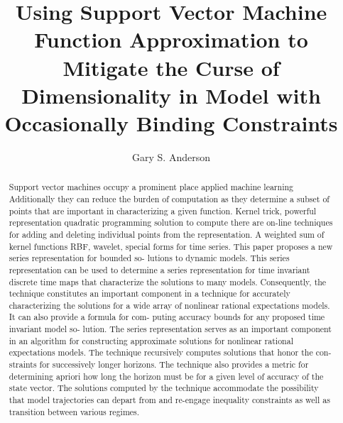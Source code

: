 \documentclass[12pt]{article}
\title{Using Support Vector Machine Function Approximation to
Mitigate the Curse of Dimensionality in Model with Occasionally Binding Constraints}
\author{Gary S. Anderson}
\begin{document}
\begin{abstract}
Support vector machines occupy a prominent place applied machine learning
Additionally they can reduce the burden of computation as they determine 
a subset of points that are important in characterizing a given function.
Kernel trick,  powerful representation quadratic programming solution to compute there are on-line techniques for adding and deleting individual points from the representation.  A weighted sum of kernel functions RBF, wavelet, special forms for time series.
  This paper proposes a new series representation for bounded so-
lutions to dynamic models. This series representation can be used
to determine a series representation for time invariant discrete time
maps that characterize the solutions to many models. Consequently,
the technique constitutes an important component in a technique for
accurately characterizing the solutions for a wide array of nonlinear
rational expectations models. It can also provide a formula for com-
puting accuracy bounds for any proposed time invariant model so-
lution. The series representation serves as an important component
in an algorithm for constructing approximate solutions for nonlinear
rational expectations models.
The technique recursively computes solutions that honor the con-
straints for successively longer horizons. The technique also provides
a metric for determining apriori how long the horizon must be for a
given level of accuracy of the state vector. The solutions computed by
the technique accommodate the possibility that model trajectories can
depart from and re-engage inequality constraints as well as transition
between various regimes.
\end{abstract}
\end{document}
